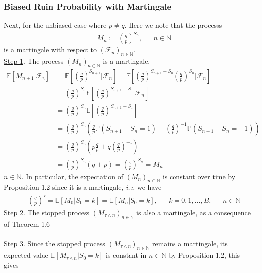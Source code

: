 \documentclass[12pt]{extarticle}
\newcommand{\<}{\langle}
\renewcommand{\>}{\rangle}
\theoremstyle{definition}
\begin{document}
\newpage
\subsubsection{Biased Ruin Probability with Martingale}
Next, for the unbiased case where $p \neq q$.
Here we note that the processs
\begin{align*}
    && M_n := \left( \frac{q}{p} \right)^{S_n}, && n \in \mathbb{N}
\end{align*}
is a martingale with respect to $(\mathcal{F}_n)_{n \in \mathbb{N}}$.\\
\underline{Step 1}. The process $(M_n)_{n \in \mathbb{N}}$ is a martingale.
\begin{align*}
    \mathbb{E}[M_{n+1}|\mathcal{F}_n]&= \mathbb{E}\left[\left( \frac{q}{p} \right)^{S_{n+1}} \bigg| \mathcal{F}_n \right] = \mathbb{E}\left[\left( \frac{q}{p} \right)^{S_{n+1} -S_n} \left( \frac{q}{p} \right)^{S_n} \bigg| \mathcal{F}_n \right] \\
    &= \left( \frac{q}{p} \right)^{S_n} \mathbb{E}\left[\left( \frac{q}{p} \right)^{S_{n+1} -S_n} \bigg| \mathcal{F}_n \right]\\
    &= \left( \frac{q}{p} \right)^{S_n} \mathbb{E}\left[\left( \frac{q}{p} \right)^{S_{n+1} -S_n} \right]\\
    &= \left( \frac{q}{p} \right)^{S_n} \left( \frac{q}{p} \mathbb{P}(S_{n+1} -S_{n} =1) + \left(\frac{q}{p}\right)^{-1} \mathbb{P}(S_{n+1} -S_{n} =-1) \right)\\
    &= \left( \frac{q}{p} \right)^{S_n} \left( p\frac{q}{p}  + q\left(\frac{q}{p}\right)^{-1} \right)\\
    &= \left( \frac{q}{p} \right)^{S_n} (q+p) = \left( \frac{q}{p} \right)^{S_n} = M_n
\end{align*}
$n \in \mathbb{N}$. In particular, the expectation of $(M_n)_{n \in \mathbb{N}}$ is constant over time by Proposition 1.2 since it is a martingale, \textit{i.e.} we have
\begin{align*}
    && \left( \frac{q}{p} \right)^k = \mathbb{E}[M_0 | S_0 =k] = \mathbb{E}[M_n | S_0 =k], && k=0,1,...,B, && n \in \mathbb{N}
\end{align*}
\underline{Step 2}. The stopped process $(M_{\tau \wedge n})_{n \in \mathbb{N}}$ is also a martingale, as a consequence of Theorem 1.6\\ \\
\underline{Step 3}. Since the stopped process $(M_{\tau \wedge n})_{n \in \mathbb{N}}$ remains a martingale, its expected value $\mathbb{E}[M_{\tau \wedge n}|S_0 =k]$ is constant in $n \in \mathbb{N}$ by Proposition 1.2, this gives
\end{document}
